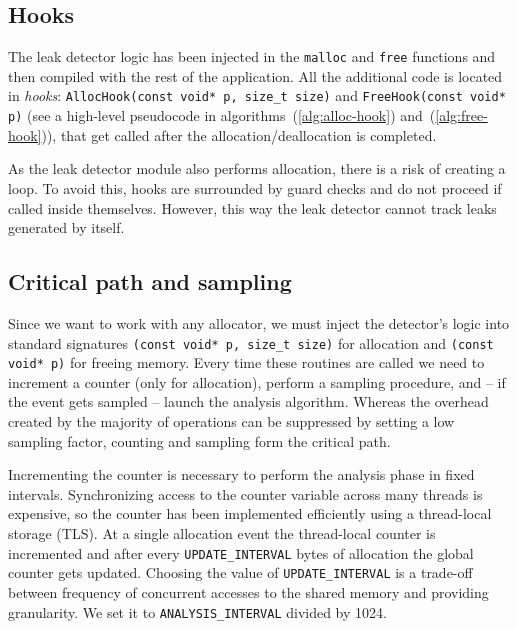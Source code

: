 \documentclass[preprint, numbers]{sigplanconf}
\begin{document}
\subsection{Hooks}

The leak detector logic has been injected in the \texttt{malloc} and \texttt{free} functions
and then compiled with the rest of the application.
All the additional code is located in \textit{hooks}: \texttt{AllocHook(const void*~p, size\_t size)}
and \texttt{FreeHook(const void* p)}
(see a high-level pseudocode in algorithms~(\ref{alg:alloc-hook}) and~(\ref{alg:free-hook})),
that get called after the allocation/deallocation is completed.

As the leak detector module also performs allocation, there is a risk
of creating a loop.
To avoid this, hooks are surrounded by guard checks and do not proceed
if called inside themselves.
However, this way the leak detector cannot track leaks generated by itself.

\subsection{Critical path and sampling}

Since we want to work with any allocator, we must inject the detector's logic into
standard signatures \texttt{(const void* p, size\_t size)} for allocation and
\texttt{(const void* p)} for freeing memory.
Every time these routines are called we need to increment a counter (only for allocation),
perform a sampling procedure, and -- if the event gets sampled -- launch the analysis algorithm.
Whereas the overhead created by the majority of operations can be suppressed by setting a low
sampling factor, counting and sampling form the critical path.

Incrementing the counter is necessary to perform the analysis phase in fixed intervals.
Synchronizing access to the counter variable across many threads is expensive,
so the counter has been implemented efficiently using a thread-local storage (TLS).
At a single allocation event the thread-local counter is incremented and after every \texttt{UPDATE\_INTERVAL}
bytes of allocation the global counter gets updated.
Choosing the value of \texttt{UPDATE\_INTERVAL} is a trade-off between frequency of concurrent accesses
to the shared memory and providing granularity.
We set it to \texttt{ANALYSIS\_INTERVAL} divided by 1024.
\end{document}
